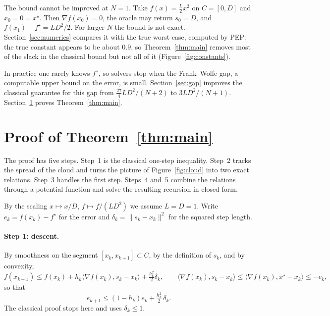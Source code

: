 \documentclass[11pt]{article}
\theoremstyle{remark}
\begin{document}
The bound cannot be improved at $N=1$. Take $f(x)=\frac L2x^2$ on $C=[0,D]$ and
$x_0=0=x^\star$. Then $\nabla f(x_0)=0$, the oracle may return $s_0=D$, and
$f(x_1)-f^\star=LD^2/2$. For larger $N$ the bound is not exact.
Section~\ref{sec:numerics} compares it with the true worst case, computed by PEP:
the true constant appears to be about $0.9$, so Theorem~\ref{thm:main} removes
most of the slack in the classical bound but not all of it
(Figure~\ref{fig:constants}).

In practice one rarely knows $f^\star$, so solvers stop when the Frank--Wolfe gap,
a computable upper bound on the error, is small. Section~\ref{sec:gap} improves the
classical guarantee for this gap from $\frac{27}{4}LD^2/(N+2)$ to $3LD^2/(N+1)$.
Section~\ref{sec:proof} proves Theorem~\ref{thm:main}.

\section{Proof of Theorem~\ref{thm:main}}\label{sec:proof}

The proof has five steps. Step~1 is the classical one-step inequality. Step~2
tracks the spread of the cloud and turns the picture of Figure~\ref{fig:cloud} into
two exact relations. Step~3 handles the first step. Steps~4 and~5 combine the
relations through a potential function and solve the resulting recursion in
closed form.

By the scaling $x\mapsto x/D$, $f\mapsto f/(LD^2)$ we assume $L=D=1$. Write
$e_k=f(x_k)-f^\star$ for the error and $\delta_k=\|s_k-x_k\|^2$ for the squared
step length.

\paragraph{Step 1: descent.}
By smoothness on the segment $[x_k,x_{k+1}]\subset C$, by the definition of $s_k$,
and by convexity,
\[
  f(x_{k+1})\le f(x_k)+h_k\langle\nabla f(x_k),s_k-x_k\rangle+\tfrac{h_k^2}{2}\delta_k,
  \qquad
  \langle\nabla f(x_k),s_k-x_k\rangle\le\langle\nabla f(x_k),x^\star-x_k\rangle\le-e_k,
\]
so that
\begin{equation}\label{eq:descent}
  e_{k+1}\le(1-h_k)e_k+\tfrac{h_k^2}{2}\,\delta_k .
\end{equation}
The classical proof stops here and uses $\delta_k\le1$.
\end{document}
